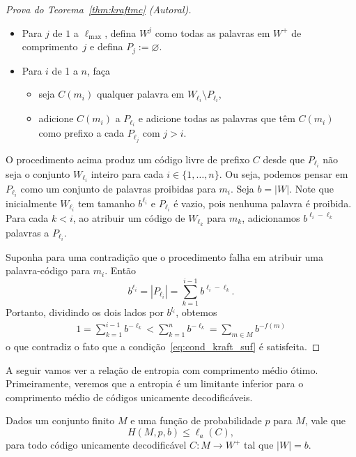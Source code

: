 \begin{proof}[Prova do Teorema~\ref{thm:kraftmc} (Autoral)]
\begin{itemize}
  \item Para $j$ de $1$ a $\ell_{\max}$, defina $W^j$ como todas as
    palavras em $W^+$ de comprimento~$j$ e defina $P_j :=
    \varnothing$.
  \item Para $i$ de 1 a $n$, faça
    \begin{itemize}
    \item seja $C(m_i)$ qualquer palavra em $W_{\ell_i}\setminus P_{\ell_i}$,
    \item adicione $C(m_i)$ a $P_{\ell_i}$ e adicione todas as palavras que
      têm $C(m_i)$ como prefixo a cada $P_{\ell_j}$ com $j>i$.
    \end{itemize}
\end{itemize}

O procedimento acima produz um código livre de prefixo $C$ desde que
$P_{\ell_i}$ não seja o conjunto $W_{\ell_i}$ inteiro para cada
$i\in\{1,\dotsc,n\}$. Ou seja, podemos pensar em $P_{\ell_i}$ como um
conjunto de palavras proibidas para $m_i$. Seja $b = |W|$. Note que
inicialmente $W_{\ell_i}$ tem tamanho $b^{\ell_i}$ e $P_{\ell_i}$ é vazio, pois
nenhuma palavra é proibida.  Para cada $k<i$, ao atribuir um código de
$W_{\ell_{k}}$ para $m_k$, adicionamos $b^{\ell_i - \ell_k}$ palavras a
$P_{\ell_i}$.

Suponha para uma contradição que o procedimento falha em atribuir uma
palavra-código para $m_i$. Então
\begin{equation*}
b^{\ell_i} = |P_{\ell_i}| = \sum_{k=1}^{i-1} b^{\ell_i - \ell_k}.
\end{equation*}
Portanto, dividindo os dois lados por $b^{l_i}$, obtemos
\begin{align*}
  1 = \sum_{k=1}^{i-1} b^{- \ell_k} <  \sum_{k=1}^{n} b^{- \ell_k} = \sum_{m\in M} b^{-f(m)}
\end{align*}
o que contradiz o fato que a condição~\eqref{eq:cond_kraft_suf} é satisfeita.
\end{proof}

A seguir vamos ver a relação de entropia com comprimento médio
ótimo. Primeiramente, veremos que a entropia é um limitante inferior
para o comprimento médio de códigos unicamente decodificáveis.

\begin{lemma}
  \label{lem:entropia_inf}
  Dados um conjunto finito $M$ e uma função de probabilidade $p$ para
  $M$, vale que
\begin{equation*}
  H(M, p, b) \leq \ell_a(C),
\end{equation*}
para todo código unicamente decodificável $C:M\to W^+$ tal que $|W| =
b$.
\end{lemma}


